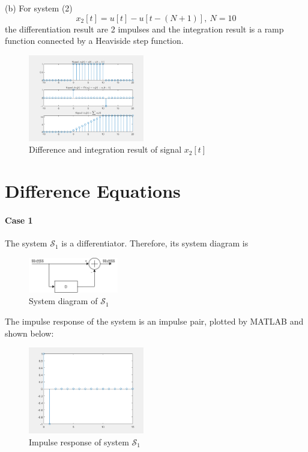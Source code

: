 \documentclass[conference]{IEEEtran}
\begin{document}
(b) For system (2)
\begin{equation}
	x_{2}[t]=u[t]-u[t-(N+1)],\ N=10
\end{equation}
the differentiation result are 2 impulses and the integration result is a ramp function connected by a Heaviside step function.
\begin{figure}[htpb]
	\begin{center}
		\includegraphics[width=0.45\textwidth]{../matlab/q23_2.png}
		\caption{Difference and integration result of signal \(x_{2}[t]\)}
		\label{fig:12}
	\end{center}
\end{figure}

\section{Difference Equations}
\paragraph{Case 1}
The system \(\mathcal{S}_{1}\) is a differentiator. Therefore, its system diagram is
\begin{figure}[htpb]
	\includegraphics[width=0.35\textwidth]{221-dif.png}
	\caption{System diagram of \(\mathcal{S}_{1}\)}
	\label{fig:13}
\end{figure}

The impulse response of the system is an impulse pair, plotted by MATLAB and shown below:
\begin{figure}[htpb]
	\includegraphics[width=0.45\textwidth]{../matlab/q24_1.png}
	\caption{Impulse response of system \(\mathcal{S}_{1}\)}
	\label{fig:14}
\end{figure}
\end{document}
